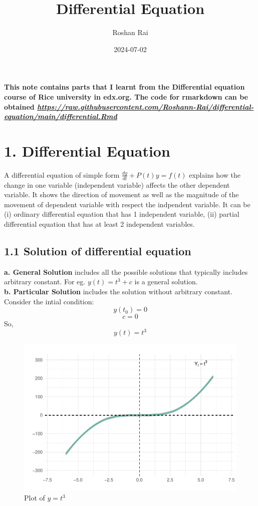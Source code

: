\documentclass[
  11pt,
]{article}
\title{Differential Equation}
\author{Roshan Rai}
\date{2024-07-02}
\begin{document}
\maketitle

\onehalfspacing

\textbf{This note contains parts that I learnt from the Differential
equation course of Rice university in edx.org. The code for rmarkdown
can be obtained
\emph{\url{https://raw.githubusercontent.com/Roshann-Rai/differential-equation/main/differential.Rmd}}}

\section{1. Differential Equation}\label{differential-equation}

A differential equation of simple form \(\frac{dy}{dt} + P(t)y = f(t)\)
explains how the change in one variable (independent variable) affects
the other dependent variable. It shows the direction of movement as well
as the magnitude of the movement of dependent variable with respect the
indpendent variable. It can be (i) ordinary differential equation that
has 1 independent variable, (ii) partial differential equation that has
at least 2 independent variables.

\subsection{1.1 Solution of differential
equation}\label{solution-of-differential-equation}

\textbf{a. General Solution} includes all the possible solutions that
typically includes arbitrary constant. For eg. \(y(t) = t^3 + c\) is a
general solution.\\
\textbf{b. Particular Solution} includes the solution without arbitrary
constant. Consider the intial condition: \[y(t_0) = 0\] \[c = 0\] So,
\[y(t) = t^3\] \clearpage

\begin{figure}

{\centering \includegraphics{differential_files/figure-latex/difference1-1} 

}

\caption{Plot of $y = t^3$}\label{fig:difference1}
\end{figure}
\end{document}
